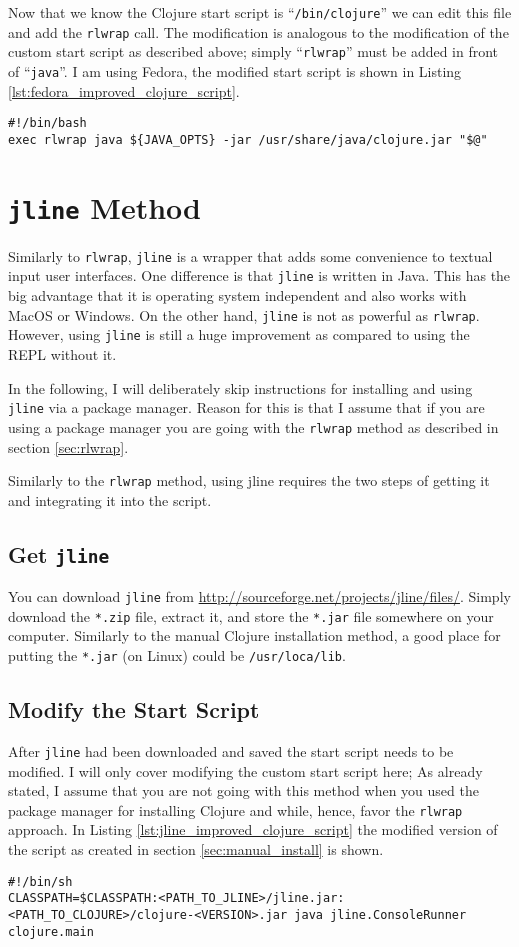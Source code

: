 Now that we know the Clojure start script is ``\texttt{/bin/clojure}'' we can edit this file and add the \texttt{rlwrap} call.
The modification is analogous to the modification of the custom start script as described above;
simply ``\texttt{rlwrap}'' must be added in front of ``\texttt{java}''.
I am using Fedora, the modified start script is shown in Listing \vref{lst:fedora_improved_clojure_script}.

\begin{lstlisting}[label=lst:fedora_improved_clojure_script, caption=Modified Clojure Start Script on Fedora 17]
#!/bin/bash
exec rlwrap java ${JAVA_OPTS} -jar /usr/share/java/clojure.jar "$@"
\end{lstlisting}

\section{\texttt{jline} Method}
Similarly to \texttt{rlwrap}, \texttt{jline} is a wrapper that adds some convenience to textual input user interfaces.
One difference is that \texttt{jline} is written in Java.
This has the big advantage that it is operating system independent and also works with MacOS or Windows.
On the other hand, \texttt{jline} is not as powerful as \texttt{rlwrap}.
However, using \texttt{jline} is still a huge improvement as compared to using the REPL without it.

In the following, I will deliberately skip instructions for installing and using \texttt{jline} via a package manager.
Reason for this is that I assume that if you are using a package manager you are going with the \texttt{rlwrap} method as described in section \vref{sec:rlwrap}.

Similarly to the \texttt{rlwrap} method, using jline requires the two steps of getting it and integrating it into the script.

\subsection{Get \texttt{jline}}
You can download \texttt{jline} from \url{http://sourceforge.net/projects/jline/files/}.
Simply download the \texttt{*.zip} file, extract it, and store the \texttt{*.jar} file somewhere on your computer.
Similarly to the manual Clojure installation method, a good place for putting the \texttt{*.jar} (on Linux) could be \texttt{/usr/loca/lib}.

\subsection{Modify the Start Script}
After \texttt{jline} had been downloaded and saved the start script needs to be modified.
I will only cover modifying the custom start script here;
As already stated, I assume that you are not going with this method when you used the package manager for installing Clojure and while, hence, favor the \texttt{rlwrap} approach.
In Listing \vref{lst:jline_improved_clojure_script} the modified version of the script as created in section \vref{sec:manual_install} is shown.

\begin{lstlisting}[label=lst:jline_improved_clojure_script, caption=Clojure Start Script Modified to Use \texttt{jline}]
#!/bin/sh
CLASSPATH=$CLASSPATH:<PATH_TO_JLINE>/jline.jar:<PATH_TO_CLOJURE>/clojure-<VERSION>.jar java jline.ConsoleRunner clojure.main
\end{lstlisting}


